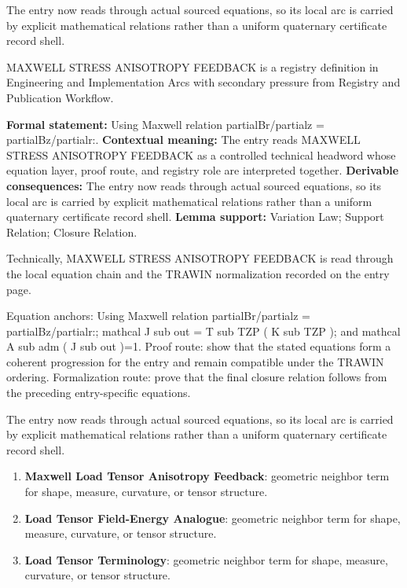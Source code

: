 The entry now reads through actual sourced equations, so its local arc is carried by explicit mathematical relations rather than a uniform quaternary certificate record shell.
\clearpage


\begingroup\small
{}
MAXWELL STRESS ANISOTROPY FEEDBACK is a registry definition in Engineering and Implementation Arcs with secondary pressure from Registry and Publication Workflow.

\begingroup\footnotesize\setlength{\emergencystretch}{3em}\sloppy
\textbf{Formal statement:} Using Maxwell relation partialBr/partialz = partialBz/partialr:. \textbf{Contextual meaning:} The entry reads MAXWELL STRESS ANISOTROPY FEEDBACK as a controlled technical headword whose equation layer, proof route, and registry role are interpreted together. \textbf{Derivable consequences:} The entry now reads through actual sourced equations, so its local arc is carried by explicit mathematical relations rather than a uniform quaternary certificate record shell. \textbf{Lemma support:} Variation Law; Support Relation; Closure Relation.\par
\endgroup

Technically, MAXWELL STRESS ANISOTROPY FEEDBACK is read through the local equation chain and the TRAWIN normalization recorded on the entry page.

Equation anchors: Using Maxwell relation partialBr/partialz = partialBz/partialr:; mathcal J sub out = T sub TZP ( K sub TZP ); and mathcal A sub adm ( J sub out )=1. Proof route: show that the stated equations form a coherent progression for the entry and remain compatible under the TRAWIN ordering. Formalization route: prove that the final closure relation follows from the preceding entry-specific equations.

The entry now reads through actual sourced equations, so its local arc is carried by explicit mathematical relations rather than a uniform quaternary certificate record shell.
\endgroup

\begin{enumerate}[leftmargin=1.6em,itemsep=6pt,topsep=4pt]
\item \textbf{Maxwell Load Tensor Anisotropy Feedback}: geometric neighbor term for shape, measure, curvature, or tensor structure.
\item \textbf{Load Tensor Field-Energy Analogue}: geometric neighbor term for shape, measure, curvature, or tensor structure.
\item \textbf{Load Tensor Terminology}: geometric neighbor term for shape, measure, curvature, or tensor structure.
\end{enumerate}

